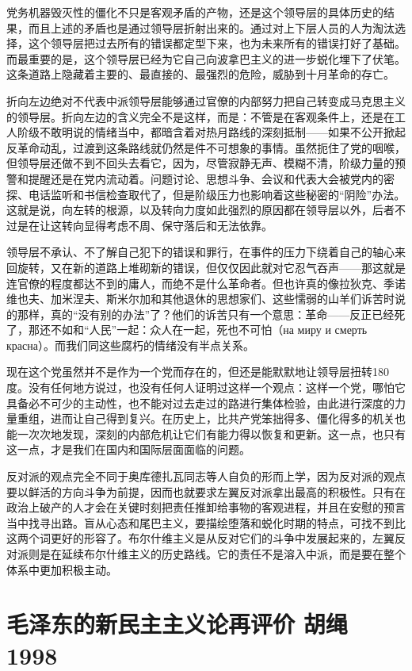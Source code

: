 \documentclass[UTF8, 12pt, a4paper]{ctexrep}
\begin{document}
党务机器毁灭性的僵化不只是客观矛盾的产物，还是这个领导层的具体历史的结果，而且上述的矛盾也是通过领导层折射出来的。通过对上下层人员的人为淘汰选择，这个领导层把过去所有的错误都定型下来，也为未来所有的错误打好了基础。而最重要的是，这个领导层已经为它自己向波拿巴主义的进一步蜕化埋下了伏笔。这条道路上隐藏着主要的、最直接的、最强烈的危险，威胁到十月革命的存亡。

折向左边绝对不代表中派领导层能够通过官僚的内部努力把自己转变成马克思主义的领导层。折向左边的含义完全不是这样，而是：不管是在客观条件上，还是在工人阶级不敢明说的情绪当中，都暗含着对热月路线的深刻抵制——如果不公开掀起反革命动乱，过渡到这条路线就仍然是件不可想象的事情。虽然扼住了党的咽喉，但领导层还做不到不回头去看它，因为，尽管寂静无声、模糊不清，阶级力量的预警和提醒还是在党内流动着。问题讨论、思想斗争、会议和代表大会被党内的密探、电话监听和书信检查取代了，但是阶级压力也影响着这些秘密的“阴险”办法。这就是说，向左转的根源，以及转向力度如此强烈的原因都在领导层以外，后者不过是在让这转向显得考虑不周、保守落后和无法依靠。

领导层不承认、不了解自己犯下的错误和罪行，在事件的压力下绕着自己的轴心来回旋转，又在新的道路上堆砌新的错误，但仅仅因此就对它忍气吞声——那这就是连官僚的程度都达不到的庸人，而绝不是什么革命者。但也许真的像拉狄克、季诺维也夫、加米涅夫、斯米尔加和其他退休的思想家们、这些懦弱的山羊们诉苦时说的那样，真的“没有别的办法”了？他们的诉苦只有一个意思：革命——反正已经死了，那还不如和“人民”一起：众人在一起，死也不可怕（на миру и смерть красна）。而我们同这些腐朽的情绪没有半点关系。

现在这个党虽然并不是作为一个党而存在的，但还是能默默地让领导层扭转180度。没有任何地方说过，也没有任何人证明过这样一个观点：这样一个党，哪怕它具备必不可少的主动性，也不能对过去走过的路进行集体检验，由此进行深度的力量重组，进而让自己得到复兴。在历史上，比共产党笨拙得多、僵化得多的机关也能一次次地发现，深刻的内部危机让它们有能力得以恢复和更新。这一点，也只有这一点，才是我们在国内和国际层面面临的问题。

反对派的观点完全不同于奥库德扎瓦同志等人自负的形而上学，因为反对派的观点要以鲜活的方向斗争为前提，因而也就要求左翼反对派拿出最高的积极性。只有在政治上破产的人才会在关键时刻把责任推卸给事物的客观进程，并且在安慰的预言当中找寻出路。盲从心态和尾巴主义，要描绘堕落和蜕化时期的特点，可找不到比这两个词更好的形容了。布尔什维主义是从反对它们的斗争中发展起来的，左翼反对派则是在延续布尔什维主义的历史路线。它的责任不是溶入中派，而是要在整个体系中更加积极主动。

\newpage
\chapter{毛泽东的新民主主义论再评价 胡绳 1998}
\end{document}
